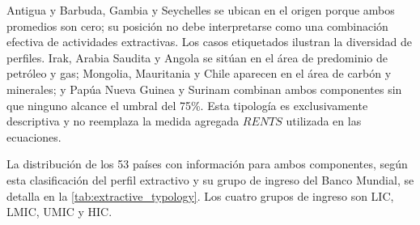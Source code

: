\documentclass[../../TFM.tex]{subfiles}
\begin{document}
	Antigua y Barbuda, Gambia y Seychelles se ubican en el origen porque ambos
	promedios son cero; su posición no debe interpretarse como una combinación
	efectiva de actividades extractivas. Los casos etiquetados ilustran la
	diversidad de perfiles. Irak, Arabia
	Saudita y Angola se sitúan en el área de predominio de petróleo y gas;
	Mongolia, Mauritania y Chile aparecen en el área de carbón y minerales; y
	Papúa Nueva Guinea y Surinam combinan ambos componentes sin que ninguno
	alcance el umbral del 75\%. Esta tipología es exclusivamente descriptiva y no
	reemplaza la medida agregada $RENTS$ utilizada en las ecuaciones.

	La distribución de los 53 países con información para ambos componentes,
	según esta clasificación del perfil extractivo y su grupo de ingreso del
	Banco Mundial, se detalla en la \autoref{tab:extractive_typology}. Los cuatro grupos de ingreso son LIC, LMIC, UMIC y HIC.
\end{document}
